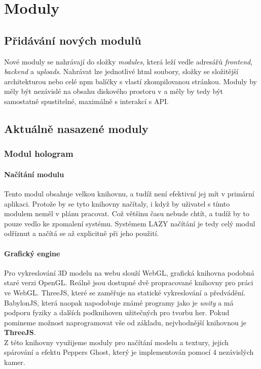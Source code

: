 \chapter{Moduly}

\section{Přidávání nových modulů}
Nové moduly se nahrávají do složky \textit{modules},
která leží vedle adresářů \textit{frontend}, \textit{backend} a \textit{uploads}.
Nahrávat lze jednotlivé html soubory, složky se složitější architekturou nebo
celé npm balíčky s vlastí zkompilovanou stránkou. Moduly by měly být nezávislé na
obsahu diskového prostoru v  a měly by tedy být samostatně spustitelné,
maximálně s interakcí s API.

\section{Aktuálně nasazené moduly}

\subsection{Modul hologram}

\subsubsection{Načítání modulu}
Tento modul obsahuje velkou knihovnu, a tudíž není efektivní jej mít v primární aplikaci.
Protože by se tyto knihovny načítaly, i když by uživatel s tímto modulem neměl v plánu pracovat.
Což většinu času nebude chtít, a tudíž by to pouze vedlo ke zpomalení systému.
Systémem LAZY načítání je tedy celý modul odříznut a načítá se až explicitně při jeho použití.

\subsubsection{Grafický engine}
Pro vykreslování 3D modelu na webu slouží WebGL, grafická knihovna podobná staré verzi OpenGL.
Reálně jsou dostupné dvě propracované knihovny pro práci ve WebGL.
ThreeJS, které se zaměřuje na statické vykreslování a předvádění.
BabylonJS, která naopak napodobuje známé programy jako je \textit{unity} a má podporu
fyziky a dalších podknihoven užitečných pro tvorbu her.
Pokud pomineme možnost naprogramovat vše od základu, nejvhodnější knihovnou 
je \textbf{ThreeJS}.\\
Z této knihovny využijeme moduly pro načítání modelu a textury, jejich spárování a
efektu Peppers Ghost, který je implementován pomocí 4 nezávislých kamer.


